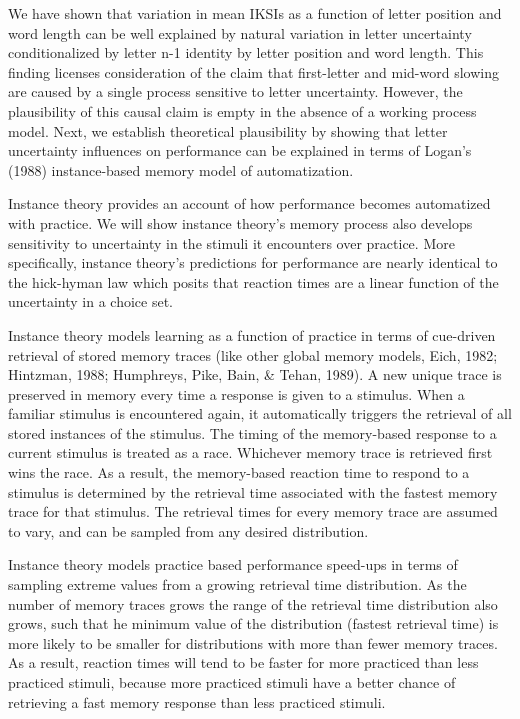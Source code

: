 \documentclass[floatsintext,man]{apa6}
\theoremstyle{definition}
\theoremstyle{definition}
\theoremstyle{definition}
\theoremstyle{remark}
\begin{document}
We have shown that variation in mean IKSIs as a function of letter
position and word length can be well explained by natural variation in
letter uncertainty conditionalized by letter n-1 identity by letter
position and word length. This finding licenses consideration of the
claim that first-letter and mid-word slowing are caused by a single
process sensitive to letter uncertainty. However, the plausibility of
this causal claim is empty in the absence of a working process model.
Next, we establish theoretical plausibility by showing that letter
uncertainty influences on performance can be explained in terms of
Logan's (1988) instance-based memory model of automatization.

Instance theory provides an account of how performance becomes
automatized with practice. We will show instance theory's memory process
also develops sensitivity to uncertainty in the stimuli it encounters
over practice. More specifically, instance theory's predictions for
performance are nearly identical to the hick-hyman law which posits that
reaction times are a linear function of the uncertainty in a choice set.

Instance theory models learning as a function of practice in terms of
cue-driven retrieval of stored memory traces (like other global memory
models, Eich, 1982; Hintzman, 1988; Humphreys, Pike, Bain, \& Tehan,
1989). A new unique trace is preserved in memory every time a response
is given to a stimulus. When a familiar stimulus is encountered again,
it automatically triggers the retrieval of all stored instances of the
stimulus. The timing of the memory-based response to a current stimulus
is treated as a race. Whichever memory trace is retrieved first wins the
race. As a result, the memory-based reaction time to respond to a
stimulus is determined by the retrieval time associated with the fastest
memory trace for that stimulus. The retrieval times for every memory
trace are assumed to vary, and can be sampled from any desired
distribution.

Instance theory models practice based performance speed-ups in terms of
sampling extreme values from a growing retrieval time distribution. As
the number of memory traces grows the range of the retrieval time
distribution also grows, such that he minimum value of the distribution
(fastest retrieval time) is more likely to be smaller for distributions
with more than fewer memory traces. As a result, reaction times will
tend to be faster for more practiced than less practiced stimuli,
because more practiced stimuli have a better chance of retrieving a fast
memory response than less practiced stimuli.
\end{document}
